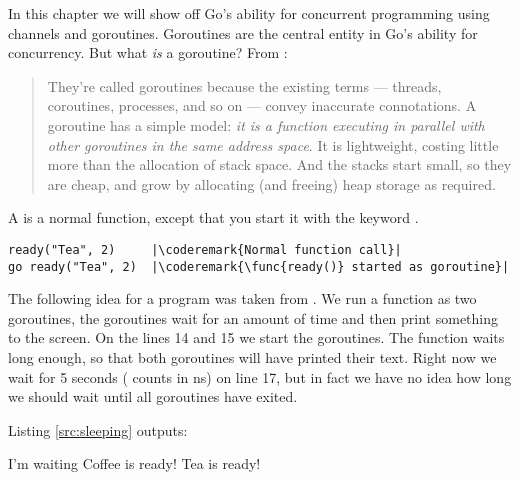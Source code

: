 \noindent{}In this chapter we will show off Go's ability for
concurrent programming using channels and goroutines. Goroutines
are the central entity in Go's ability for concurrency. But what
\emph{is} a goroutine? From \cite{effective_go}:
\begin{quote}
They're called goroutines because the existing terms --- threads, coroutines,
processes, and so on --- convey inaccurate connotations. A goroutine has a simple
model: \emph{it is a function executing in parallel with other goroutines in the same
address space}. It is lightweight, costing little more than the allocation of
stack space. And the stacks start small, so they are cheap, and grow by
allocating (and freeing) heap storage as required.
\end{quote}
A  is a normal function, except that you start
it with the keyword .
\begin{lstlisting}
ready("Tea", 2)	    |\coderemark{Normal function call}|
go ready("Tea", 2)  |\coderemark{\func{ready()} started as goroutine}|
\end{lstlisting}
The following idea for a program was taken from \cite{go_course_day3}. 
We run a function as two goroutines, the goroutines wait for an amount of
time and then print something to the screen. 
On the lines 14 and 15 we start the goroutines.
The  function
waits long enough, so that both goroutines will have printed their text. Right
now we wait for 5 seconds ( counts in ns) on line 17, but in fact we have no idea how
long we should wait until all goroutines have exited.

Listing \ref{src:sleeping} outputs:
\begin{display}
I'm waiting         
Coffee is ready!    
Tea is ready!       
\end{display}

